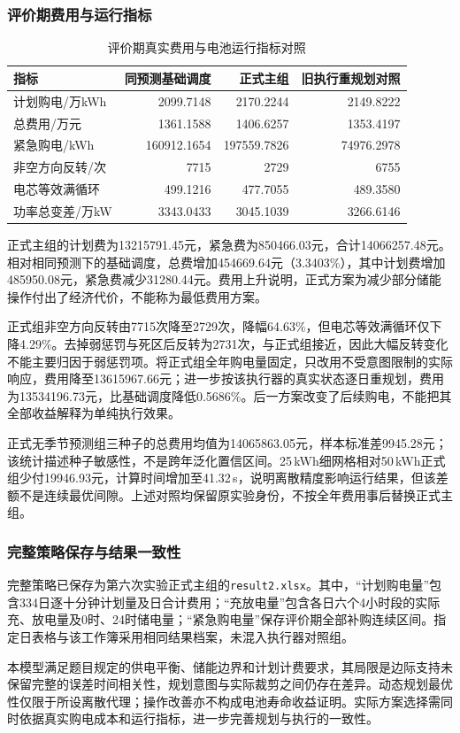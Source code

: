 \subsubsection{评价期费用与运行指标}

\begin{table}[H]
\centering\small
\setlength{\tabcolsep}{3pt}
\renewcommand{\arraystretch}{1.13}
\caption{评价期真实费用与电池运行指标对照}\label{tab:q2-annual}
\begin{tabularx}{\textwidth}{Xrrr}
\toprule
指标 & 同预测基础调度 & 正式主组 & 旧执行重规划对照\\
\midrule
计划购电/万kWh & 2099.7148 & 2170.2244 & 2149.8222\\
总费用/万元 & 1361.1588 & 1406.6257 & 1353.4197\\
紧急购电/kWh & 160912.1654 & 197559.7826 & 74976.2978\\
非空方向反转/次 & 7715 & 2729 & 6755\\
电芯等效满循环 & 499.1216 & 477.7055 & 489.3580\\
功率总变差/万kW & 3343.0433 & 3045.1039 & 3266.6146\\
\bottomrule\end{tabularx}
\end{table}


正式主组的计划费为13215791.45元，紧急费为850466.03元，合计14066257.48元。相对相同预测下的基础调度，总费增加454669.64元（3.3403\%），其中计划费增加485950.08元，紧急费减少31280.44元。费用上升说明，正式方案为减少部分储能操作付出了经济代价，不能称为最低费用方案。

正式组非空方向反转由7715次降至2729次，降幅64.63\%，但电芯等效满循环仅下降4.29\%。去掉弱惩罚与死区后反转为2731次，与正式组接近，因此大幅反转变化不能主要归因于弱惩罚项。将正式组全年购电量固定，只改用不受意图限制的实际响应，费用降至13615967.66元；进一步按该执行器的真实状态逐日重规划，费用为13534196.73元，比基础调度降低0.5686\%。后一方案改变了后续购电，不能把其全部收益解释为单纯执行效果。

正式无季节预测组三种子的总费用均值为14065863.05元，样本标准差9945.28元；该统计描述种子敏感性，不是跨年泛化置信区间。25\,kWh细网格相对50\,kWh正式组少付19946.93元，计算时间增加至41.32\,s，说明离散精度影响运行结果，但该差额不是连续最优间隙。上述对照均保留原实验身份，不按全年费用事后替换正式主组。

\subsubsection{完整策略保存与结果一致性}

完整策略已保存为第六次实验正式主组的\texttt{result2.xlsx}。其中，“计划购电量”包含334日逐十分钟计划量及日合计费用；“充放电量”包含各日六个4小时段的实际充、放电量及0时、24时储电量；“紧急购电量”保存评价期全部补购连续区间。指定日表格与该工作簿采用相同结果档案，未混入执行器对照组。

本模型满足题目规定的供电平衡、储能边界和计划计费要求，其局限是边际支持未保留完整的误差时间相关性，规划意图与实际裁剪之间仍存在差异。动态规划最优性仅限于所设离散代理；操作改善亦不构成电池寿命收益证明。实际方案选择需同时依据真实购电成本和运行指标，进一步完善规划与执行的一致性。
\clearpage
